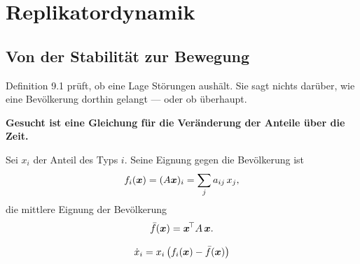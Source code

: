 \chapter{Replikatordynamik}

\section{Von der Stabilität zur Bewegung}

\begin{merksatz}
Definition 9.1 prüft, ob eine Lage Störungen aushält. Sie sagt nichts darüber, wie eine Bevölkerung dorthin gelangt --- oder ob überhaupt.

\begin{center}
\begin{minipage}{0.9\textwidth}
\textbf{Gesucht ist eine Gleichung für die Veränderung der Anteile über die Zeit.}
\end{minipage}
\end{center}

Sei $x_i$ der Anteil des Typs $i$. Seine Eignung gegen die Bevölkerung ist
\[ f_i(\boldsymbol{x}) = (A\boldsymbol{x})_i = \sum_j a_{ij}\,x_j , \]
die mittlere Eignung der Bevölkerung
\[ \bar f(\boldsymbol{x}) = \boldsymbol{x}^{\!\top} A\,\boldsymbol{x} . \]
\end{merksatz}

\begin{definition}
\[ \dot x_i = x_i\,\bigl(f_i(\boldsymbol{x}) - \bar f(\boldsymbol{x})\bigr) \]
\end{definition}


